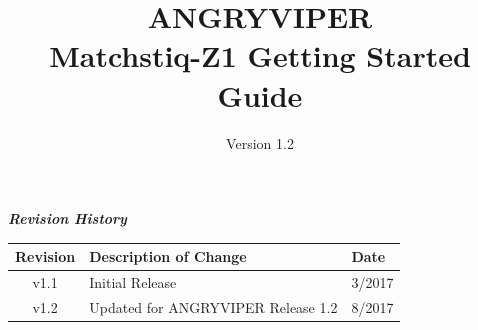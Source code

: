 \def\docTitle{ANGRYVIPER\\ Matchstiq-Z1 Getting Started Guide}
\def\docVersion{1.2}

\date{Version \docVersion} %
\title{\docTitle}
\usepackage[T1]{fontenc} %
\usepackage{graphicx}
\graphicspath{ {figures/} }
\usepackage{textcomp}

\maketitle
\newpage

	\begin{center}
	\textit{\textbf{Revision History}}
		\begin{table}[H]
		\label{table:revisions} %
			\begin{tabularx}{\textwidth}{|c|X|l|}
			\hline
			\rowcolor{blue}
			\textbf{Revision} & \textbf{Description of Change} & \textbf{Date} \\
		    \hline
            v1.1 & Initial Release & 3/2017 \\
            \hline
            v1.2 & Updated for ANGRYVIPER Release 1.2 & 8/2017 \\
            \hline
			\end{tabularx}
		\end{table}
	\end{center}

